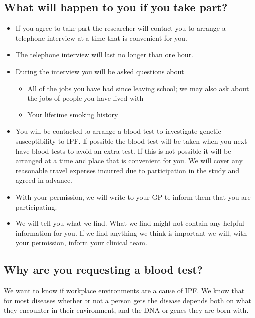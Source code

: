 \documentclass[a4paper,10pt]{article}
\begin{document}
\subsection*{What will happen to you if you take part?}
\begin{itemize}
 \item If you agree to take part the researcher will contact you to arrange a telephone interview at a time that is convenient for you.
 \item The telephone interview will last no longer than one hour.
 \item During the interview you will be asked questions about \begin{itemize}
                                                                \item All of the jobs you have had since leaving school; we may also ask about the jobs of people you have lived with
                                                                \item Your lifetime smoking history
                                                               \end{itemize}
\item You will be contacted to arrange a blood test to investigate genetic susceptibility to IPF\@. If possible the blood test will be taken when you next have blood tests to avoid an extra test. If this is
not possible it will be arranged at a time and place that is convenient for you. We will cover any reasonable travel expenses incurred due to participation in the study and agreed in advance.
\item With your permission, we will write to your GP to inform them that you are participating.
\item We will tell you what we find. What we find might not contain any helpful information for you. If we find anything we think is important we will, with your permission, inform your clinical team.
\end{itemize}

\subsection*{Why are you requesting a blood test?}

We want to know if workplace environments are a cause of IPF. We know that for most diseases whether or not a person gets the disease depends both on what they encounter in their environment, and the DNA or genes they are born with.
\end{document}
